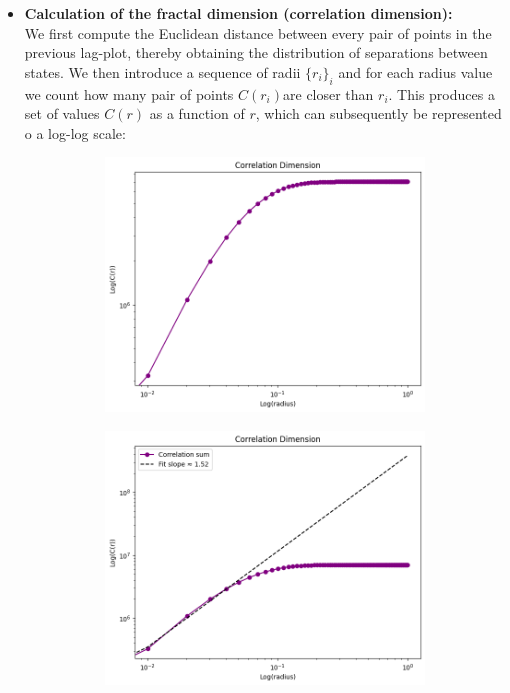 \begin{itemize}
    \item \textbf{Calculation of the fractal dimension (correlation dimension):}\\
    We first compute the Euclidean distance between every pair of points in the previous lag-plot, thereby obtaining the distribution of separations between states. We then introduce a sequence of radii $\{r_i\}_i$ and for each radius value we count how many pair of points $C(r_i)$are closer than $r_i$. This produces a set of values $C(r)$ as a function of $r$, which can subsequently be represented o a log-log scale:


    \begin{figure}[H]
        \centering
        \begin{subfigure}[t]{0.49\textwidth}
            \centering
            \includegraphics[width=\linewidth]{img/bitcoin_dimension.png}
            \label{fig:bitcoin_dimension}
        \end{subfigure}
        \hfill
        \begin{subfigure}[t]{0.49\textwidth}
            \centering
            \includegraphics[width=\linewidth]{img/correlation_dimension.png}

\end{subfigure}
\end{figure}
\end{itemize}
